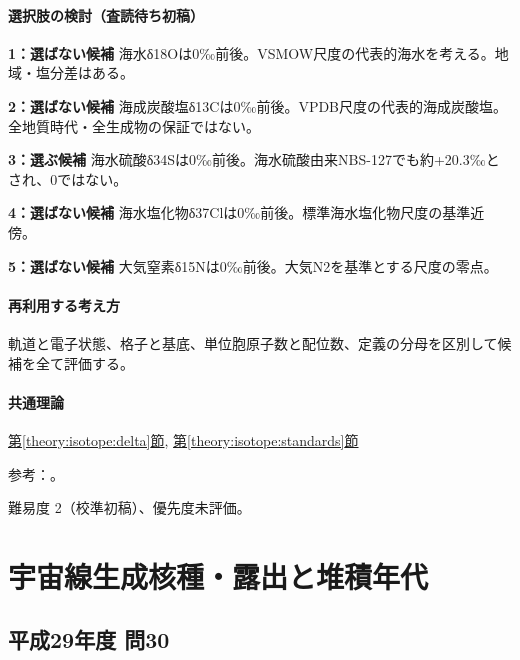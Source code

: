 \paragraph{選択肢の検討（査読待ち初稿）}\mbox{}\par

\noindent\textbf{1：選ばない候補} 海水δ18Oは0‰前後。VSMOW尺度の代表的海水を考える。地域・塩分差はある。\par

\noindent\textbf{2：選ばない候補} 海成炭酸塩δ13Cは0‰前後。VPDB尺度の代表的海成炭酸塩。全地質時代・全生成物の保証ではない。\par

\noindent\textbf{3：選ぶ候補} 海水硫酸δ34Sは0‰前後。海水硫酸由来NBS-127でも約+20.3‰とされ、0ではない。\par

\noindent\textbf{4：選ばない候補} 海水塩化物δ37Clは0‰前後。標準海水塩化物尺度の基準近傍。\par

\noindent\textbf{5：選ばない候補} 大気窒素δ15Nは0‰前後。大気N2を基準とする尺度の零点。\par

\paragraph{再利用する考え方} 軌道と電子状態、格子と基底、単位胞原子数と配位数、定義の分母を区別して候補を全て評価する。

\paragraph{共通理論} \hyperref[theory:isotope:delta]{第\ref*{theory:isotope:delta}節}, \hyperref[theory:isotope:standards]{第\ref*{theory:isotope:standards}節}

\par 参考：\cite{atomic_sulfate,iso_standards1995}。

\par 難易度 2（校準初稿）、優先度未評価。

\section{宇宙線生成核種・露出と堆積年代}

\subsection{平成29年度 問30}
\label{q:h29-reg-applied-30}

